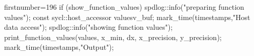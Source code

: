 \begin{cppcode*}{firstnumber=196}
        if (show_function_values) {
            spdlog::info("preparing function values");
            const sycl::host_accessor values{v_buf};
            mark_time(timestamps,"Host data access");
            spdlog::info("showing function values");
            print_function_values(values, x_min, dx, x_precision, y_precision);
            mark_time(timestamps,"Output");
        }
\end{cppcode*}
